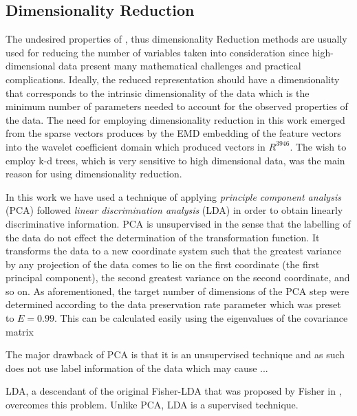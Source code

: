 \documentclass[10pt, conference, compsocconf]{IEEEtran}
\theoremstyle{definition}
\begin{document}
\subsection{Dimensionality Reduction}

The undesired properties of \cite{van2009dimensionality}, thus dimensionality Reduction methods are usually used for reducing the number of variables taken into consideration since  high-dimensional data present many mathematical challenges and practical complications. 
Ideally, the reduced representation should have a dimensionality that corresponds to the intrinsic dimensionality of the data \cite{van2009dimensionality} which is the minimum number of parameters needed to account for the observed properties of the data.
The need for employing dimensionality reduction in this work emerged from the sparse vectors produces by the EMD embedding of the feature vectors into the wavelet coefficient domain which produced vectors in $R^{3946}$. 
The wish to employ k-d trees, which is very sensitive to high dimensional data, was the main reason for using dimensionality reduction. 

In this work we have used a technique of applying \emph{principle component analysis} (PCA) followed \emph{linear discrimination analysis} (LDA) in order to obtain linearly discriminative information.
PCA is unsupervised in the sense that the labelling of the data do not effect the determination of the transformation function. 
It transforms the data to a new coordinate system such that the greatest variance by any projection of the data comes to lie on the first coordinate (the first principal component), the second greatest variance on the second coordinate, and so on.
As aforementioned, the target number of dimensions of the PCA step were determined according to the data preservation rate parameter which was preset to $E=0.99$. 
This can be calculated easily using the eigenvalues of the covariance matrix

The major drawback of PCA is that it is an unsupervised technique and as such does not use label information of the data
which may cause ...

LDA, a descendant of the original Fisher-LDA that was proposed by Fisher in \cite{fisher1936use}, overcomes this problem. Unlike PCA, LDA is a supervised technique. 
%
\end{document}
